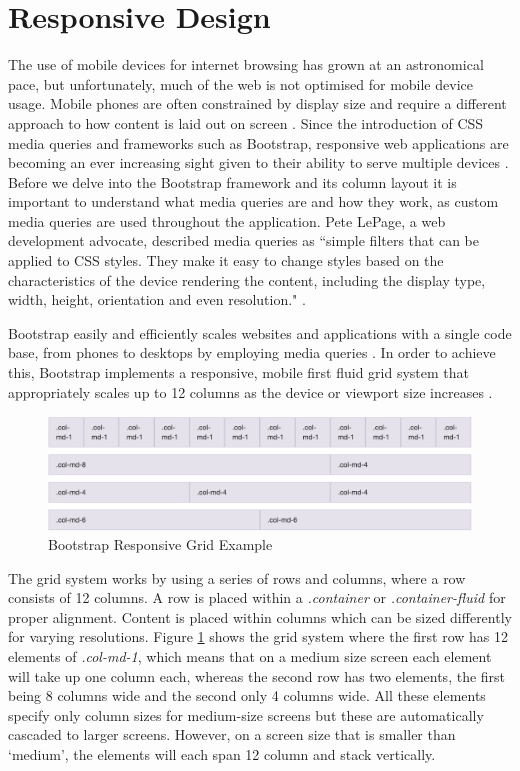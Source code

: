 \section{Responsive Design}
The use of mobile devices for internet browsing has grown at an astronomical pace, but unfortunately, much of the web is not optimised for mobile device usage. Mobile phones are often constrained by display size and require a different approach to how content is laid out on screen \cite{GoogleDev:Responsiveness}. Since the introduction of CSS media queries and frameworks such as Bootstrap, responsive web applications are becoming an ever increasing sight given to their ability to serve multiple devices \cite{Bootstrap:Home}. Before we delve into the Bootstrap framework and its column layout it is important to understand what media queries are and how they work, as custom media queries are used throughout the application. Pete LePage, a web development advocate, described media queries as ``simple filters that can be applied to CSS styles. They make it easy to change styles based on the characteristics of the device rendering the content, including the display type, width, height, orientation and even resolution." \cite{GoogleDev:Responsiveness}.

Bootstrap easily and efficiently scales websites and applications with a single code base, from phones to desktops by employing media queries \cite{Bootstrap:Home}. In order to achieve this, Bootstrap implements a responsive, mobile first fluid grid system that appropriately scales up to 12 columns as the device or viewport size increases \cite{Bootstrap:Grid}.

\begin{figure}[H]
\centering
\includegraphics[width=1.0\textwidth]{Images/Implementation/BootstrapGrid}
\caption{Bootstrap Responsive Grid Example} 
\label{fig:BootstrapGrid}
\end{figure}

The grid system works by using a series of rows and columns, where a row consists of 12 columns. A row is placed within a \emph{.container} or \emph{.container-fluid} for proper alignment. Content is placed within columns which can be sized differently for varying resolutions. Figure \ref{fig:BootstrapGrid} shows the grid system where the first row has 12 elements of \emph{.col-md-1}, which means that on a medium size screen each element will take up one column each, whereas the second row has two elements, the first being 8 columns wide and the second only 4 columns wide. All these elements specify only column sizes for medium-size screens but these are automatically cascaded to larger screens. However, on a screen size that is smaller than `medium', the elements will each span 12 column and stack vertically. 


